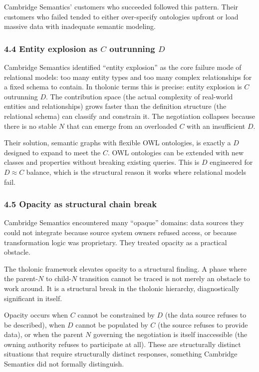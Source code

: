 \documentclass[
  11pt,
  letterpaper,
]{article}
\begin{document}
Cambridge Semantics' customers who succeeded followed this pattern.
Their customers who failed tended to either over-specify ontologies
upfront or load massive data with inadequate semantic modeling.

\subsubsection{\texorpdfstring{4.4 Entity explosion as \(C\) outrunning
\(D\)}{4.4 Entity explosion as C outrunning D}}\label{entity-explosion-as-c-outrunning-d}

Cambridge Semantics identified ``entity explosion'' as the core failure
mode of relational models: too many entity types and too many complex
relationships for a fixed schema to contain. In tholonic terms this is
precise: entity explosion is \(C\) outrunning \(D\). The contribution
space (the actual complexity of real-world entities and relationships)
grows faster than the definition structure (the relational schema) can
classify and constrain it. The negotiation collapses because there is no
stable \(N\) that can emerge from an overloaded \(C\) with an
insufficient \(D\).

Their solution, semantic graphs with flexible OWL ontologies, is exactly
a \(D\) designed to expand to meet the \(C\). OWL ontologies can be
extended with new classes and properties without breaking existing
queries. This is \(D\) engineered for \(D \approx C\) balance, which is
the structural reason it works where relational models fail.

\subsubsection{4.5 Opacity as structural chain
break}\label{opacity-as-structural-chain-break}

Cambridge Semantics encountered many ``opaque'' domains: data sources
they could not integrate because source system owners refused access, or
because transformation logic was proprietary. They treated opacity as a
practical obstacle.

The tholonic framework elevates opacity to a structural finding. A phase
where the parent-\(N\) to child-\(N\) transition cannot be traced is not
merely an obstacle to work around. It is a structural break in the
tholonic hierarchy, diagnostically significant in itself.

Opacity occurs when \(C\) cannot be constrained by \(D\) (the data
source refuses to be described), when \(D\) cannot be populated by \(C\)
(the source refuses to provide data), or when the parent \(N\) governing
the negotiation is itself inaccessible (the owning authority refuses to
participate at all). These are structurally distinct situations that
require structurally distinct responses, something Cambridge Semantics
did not formally distinguish.
\end{document}
